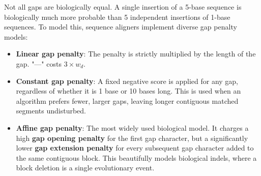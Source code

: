 \documentclass[11pt,a4paper]{article}
\begin{document}
Not all gaps are biologically equal. A single insertion of a 5-base sequence is biologically much more probable than 5 independent insertions of 1-base sequences. To model this, sequence aligners implement diverse gap penalty models:
\begin{itemize}
    \item \textbf{Linear gap penalty}: The penalty is strictly multiplied by the length of the gap. "---" costs \(3 \times w_d\).
    \item \textbf{Constant gap penalty}: A fixed negative score is applied for any gap, regardless of whether it is 1 base or 10 bases long. This is used when an algorithm prefers fewer, larger gaps, leaving longer contiguous matched segments undisturbed.
    \item \textbf{Affine gap penalty}: The most widely used biological model. It charges a high \textbf{gap opening penalty} for the first gap character, but a significantly lower \textbf{gap extension penalty} for every subsequent gap character added to the same contiguous block. This beautifully models biological indels, where a block deletion is a single evolutionary event.
\end{itemize}
\end{document}
